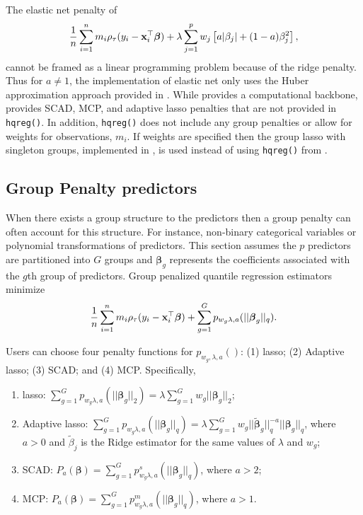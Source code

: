 The elastic net penalty of
\begin{equation}
\frac{1}{n} \sum_{i=1}^n m_i \rho_\tau(y_i - {\bf x}_i^\top\boldsymbol \beta) + \lambda \sum_{j=1}^p w_j \left[ a|\beta_j|+(1-a)\beta_j^2\right],
\label{eq:enet}
\end{equation}
cannot be framed as a linear programming problem because of the ridge penalty. Thus for \(a \neq 1\), the  implementation of elastic net only uses the Huber approximation approach provided in . While  provides a computational backbone,  provides SCAD, MCP, and adaptive lasso penalties that are not provided in \texttt{hqreg()}. In addition, \texttt{hqreg()} does not include any group penalties or allow for weights for observations, \(m_i\). If weights are specified then the group lasso with singleton groups, implemented in , is used instead of using \texttt{hqreg()} from .

\subsection{Group Penalty predictors}\label{group-penalty-predictors}

When there exists a group structure to the predictors then a group penalty can often account for this structure. For instance, non-binary categorical variables or polynomial transformations of predictors. This section assumes the \(p\) predictors are partitioned into \(G\) groups and \(\boldsymbol \beta_g\) represents the coefficients associated with the \(g\)th group of predictors. Group penalized quantile regression estimators minimize
\begin{equation}
\frac{1}{n} \sum_{i=1}^n m_i \rho_\tau(y_i - {\bf x}_i^\top\boldsymbol \beta) + \sum_{g=1}^G p_{w_g\lambda,a}(||\boldsymbol \beta_g||_q).
\label{eq:groupForm}
\end{equation}

Users can choose four penalty functions for \(p_{w_g,\lambda,a}()\): (1) lasso; (2) Adaptive lasso; (3) SCAD; and (4) MCP. Specifically,

\begin{enumerate}
\item lasso: $\sum_{g=1}^G p_{w_g\lambda,a}(||\boldsymbol \beta_g||_2)=\lambda \sum_{g=1}^G w_g ||\boldsymbol \beta_g||_2$;
\item Adaptive lasso: $\sum_{g=1}^G p_{w_g\lambda,a}(||\boldsymbol \beta_g||_q)= \lambda \sum_{g=1}^G w_g ||\tilde{\boldsymbol \beta}_g||_q^{-a} ||\boldsymbol \beta_g||_q$, where $a>0$ and $\tilde{\beta}_j$ is the Ridge estimator for the same values of $\lambda$ and $w_g$;
\item SCAD: $P_a(\boldsymbol \beta) = \sum_{g=1}^G p^s_{w_g\lambda,a}(||\boldsymbol \beta_g||_q)$, where $a>2$;
\item MCP: $P_a(\boldsymbol \beta) = \sum_{g=1}^G p^m_{w_g\lambda,a}(||\boldsymbol \beta_g||_q)$, where $a>1$.
\end{enumerate}

